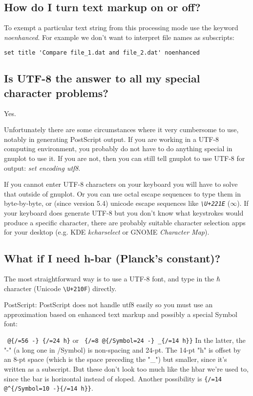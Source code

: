 \documentclass[letter,11pt]{article}
\begin{document}
{\subsection{How do I turn text markup on or off?}

To exempt a particular text string from this processing mode use the keyword
{\em noenhanced}.  For example we don't want to interpret file names as subscripts:
\small
\begin{verbatim}
set title 'Compare file_1.dat and file_2.dat' noenhanced
\end{verbatim}
\normalsize

\subsection{Is UTF-8 the answer to all my special character problems?}

Yes.

Unfortunately there are some circumstances where it very cumbersome to use,
notably in generating PostScript output.
If you are working in a UTF-8 computing environment, you probably do not have to
do anything special in gnuplot to use it.
If you are not, then you can still tell gnuplot to use UTF-8 for output:
{\em set encoding utf8}.

If you cannot enter UTF-8 characters on your keyboard you will have to solve
that outside of gnuplot. Or you can use octal escape sequences to type them in
byte-by-byte, or (since version 5.4) unicode escape sequences like
{\em \verb&\U+221E&} ($\infty$).
If your keyboard does generate UTF-8 but you don't know what keystrokes would
produce a specific character, there are probably suitable character selection
apps for your desktop (e.g. KDE {\em kcharselect} or GNOME {\em Character Map}).

\subsection{What if I need h-bar (Planck's constant)?}

The most straightforward way is to use a UTF-8 font, and type in the
$\hbar$ character (Unicode {\verb&\U+210F&}) directly.

PostScript: PostScript does not handle utf8 easily so you must use an
approximation based on enhanced text markup and possibly a special
Symbol font:

\verb+ @{/=56 -} {/=24 h}+ or
\verb+ {/=8 @{/Symbol=24 -} _{/=14 h}}+
In the latter, the "-" (a long one in /Symbol) is non-spacing and 24-pt.
The 14-pt "h" is offset by an 8-pt space (which is the space preceding
the "\_") but smaller, since it's written as a subscript.
But these don't look too much like the hbar we're used to, since the bar
is horizontal instead of sloped.
Another possibility is \verb+{/=14 @^{/Symbol=10 -}{/=14 h}}+.

}
\end{document}
